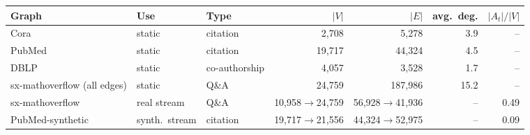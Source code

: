 \scriptsize
\begin{tabular}{@{}lllrrrr@{}}
\toprule
Graph & Use & Type & $|V|$ & $|E|$ & avg.\ deg. & $|A_t|/|V|$ \\
\midrule
Cora & static & citation & 2,708 & 5,278 & 3.9 & -- \\
PubMed & static & citation & 19,717 & 44,324 & 4.5 & -- \\
DBLP & static & co-authorship & 4,057 & 3,528 & 1.7 & -- \\
sx-mathoverflow (all edges) & static & Q\&A & 24,759 & 187,986 & 15.2 & -- \\
sx-mathoverflow & real stream & Q\&A & 10,958$\to$24,759 & 56,928$\to$41,936 & -- & 0.49 \\
PubMed-synthetic & synth.\ stream & citation & 19,717$\to$21,556 & 44,324$\to$52,975 & -- & 0.09 \\
\bottomrule
\end{tabular}
